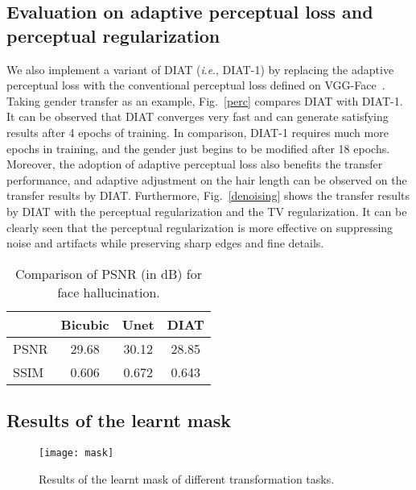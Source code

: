 \documentclass[journal]{IEEEtran}
\newcommand{\ie}{\textit{i}.\textit{e}.}
\begin{document}
\subsection{Evaluation on adaptive perceptual loss and perceptual regularization}

We also implement a variant of DIAT (\ie, DIAT-1) by replacing the adaptive perceptual loss with the conventional perceptual loss defined on VGG-Face~\cite{Parkhi15}.
Taking gender transfer as an example, Fig.~\ref{perc} compares DIAT with DIAT-1.
It can be observed that DIAT converges very fast and can generate satisfying results after 4 epochs of training.
In comparison, DIAT-1 requires much more epochs in training, and the gender just begins to be modified after 18 epochs.
Moreover, the adoption of adaptive perceptual loss also benefits the transfer performance, and adaptive adjustment on the hair length can be observed on the transfer results by DIAT.
Furthermore, Fig.~\ref{denoising} shows the transfer results by DIAT with the perceptual regularization and the TV regularization.
It can be clearly seen that the perceptual regularization is more effective on suppressing noise and artifacts while preserving sharp edges and fine details.


\begin{table}[htb]
\footnotesize
\caption{Comparison of PSNR (in dB) for face hallucination.}
\begin{center}
\begin{tabular}{l|c|c|c}
\hline
 & Bicubic & Unet\cite{ronneberger2015unet} & DIAT  \\
\hline
PSNR& 29.68& 30.12 & 28.85  \\
\hline
SSIM& 0.606& 0.672 & 0.643  \\
\hline
\end{tabular}
\end{center}
\label{table:psnr}
\end{table}


\subsection{Results of the learnt mask}
\begin{figure}
\begin{center}
\texttt{[image: mask]}
\end{center}
   \caption{Results of the learnt mask of different transformation tasks.}
\label{mask}
\end{figure}
\end{document}
